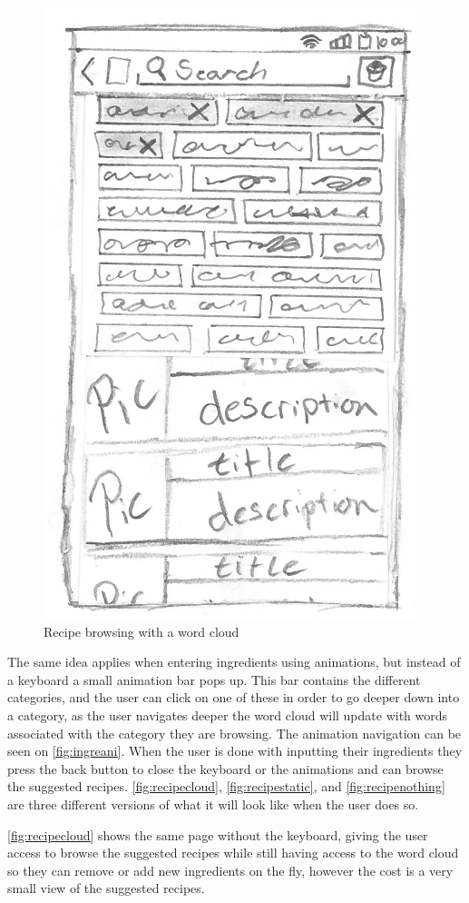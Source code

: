 \begin{figure}[H]
\begin{minipage}[b]{0.5\columnwidth}
\includegraphics[width=0.7\columnwidth]{img/prototypes/recipe_browse.pdf}
\caption{Recipe browsing with a word cloud\label{fig:recipecloud}}
\end{minipage}
\end{figure}

The same idea applies when entering ingredients using animations, but instead of a keyboard a small animation bar pops up. This bar contains the different categories, and the user can click on one of these in order to go deeper down into a category, as the user navigates deeper the word cloud will update with words associated with the category they are browsing. The animation navigation can be seen on \autoref{fig:ingreani}. When the user is done with inputting their ingredients they press the back button to close the keyboard or the animations and can browse the suggested recipes. \autoref{fig:recipecloud}, \autoref{fig:recipestatic}, and \autoref{fig:recipenothing} are three different versions of what it will look like when the user does so.

\autoref{fig:recipecloud} shows the same page without the keyboard, giving the user access to browse the suggested recipes while still having access to the word cloud so they can remove or add new ingredients on the fly, however the cost is a very small view of the suggested recipes.

